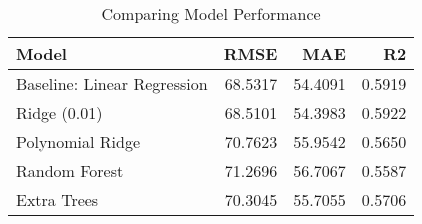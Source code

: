 \begin{table}
\centering
\caption{Comparing Model Performance}
\begin{tabular}{lrrr}
\toprule
                      Model &    RMSE &     MAE &     R2 \\
\midrule
Baseline: Linear Regression & 68.5317 & 54.4091 & 0.5919 \\
               Ridge (0.01) & 68.5101 & 54.3983 & 0.5922 \\
           Polynomial Ridge & 70.7623 & 55.9542 & 0.5650 \\
              Random Forest & 71.2696 & 56.7067 & 0.5587 \\
                Extra Trees & 70.3045 & 55.7055 & 0.5706 \\
\bottomrule
\end{tabular}
\end{table}
